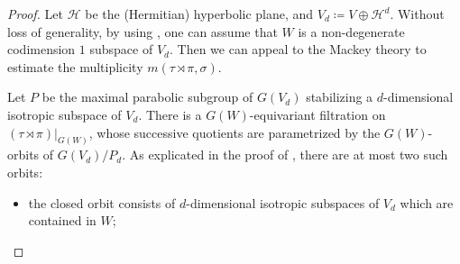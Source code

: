 \documentclass[11pt,letterpaper]{amsart}
\theoremstyle{plain}
\numberwithin{theorem}{section}
\numberwithin{equation}{subsection}
\theoremstyle{remark}
\def\calH{\mathcal{H}}
\begin{document}
\begin{proof}
Let $\calH$ be the (Hermitian) hyperbolic plane, and $V_d\coloneqq V \oplus \calH^d$. Without loss of generality, by using \cite[Thm. 15.1]{MR3202556}, one can assume that $W$ is a non-degenerate codimension $1$ subspace of $V_d$. Then we can appeal to the Mackey theory to estimate the multiplicity $m\left(\tau\rtimes \pi,\sigma\right)$. 

\vskip 5pt

Let $P$ be the maximal parabolic subgroup of $G\left(V_d\right)$ stabilizing a $d$-dimensional isotropic subspace of $V_d$. There is a $G\left(W\right)$-equivariant filtration on $\left(\tau\rtimes \pi\right)\big|_{G\left(W\right)}$, whose successive quotients are parametrized by the $G\left(W\right)$-orbits of $G\left(V_d\right)/P_d$. As explicated in the proof of \cite[Thm. 15.1]{MR3202556}, there are at most two such orbits:
\begin{itemize}
    \item the closed orbit consists of $d$-dimensional isotropic subspaces of $V_d$ which are contained in $W$;

    \vskip 5pt


\end{itemize}
\end{proof}
\end{document}
